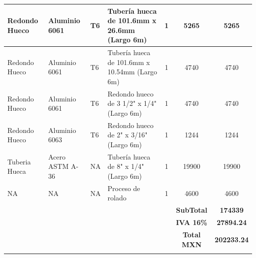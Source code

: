 \begin{landscape}
\begin{table}[H]
\begin{tabular}{|c|c|c|c|c|c|c|}
    \hline
    \multicolumn{1}{|l|}{Redondo Hueco} & \multicolumn{1}{l|}{Aluminio 6061 } & \multicolumn{1}{l|}{T6} & \multicolumn{1}{l|}{Tubería hueca de 101.6mm x 26.6mm (Largo 6m)} & 1     & \multicolumn{1}{c|}{5265} & 5265 \\
    \hline
    \multicolumn{1}{|l|}{Redondo Hueco} & \multicolumn{1}{l|}{Aluminio 6061} & \multicolumn{1}{l|}{T6} & \multicolumn{1}{l|}{Tubería hueca de 101.6mm x 10.54mm (Largo 6m)} & 1     & \multicolumn{1}{c|}{4740} & 4740 \\
    \hline
    \multicolumn{1}{|l|}{Redondo Hueco} & \multicolumn{1}{l|}{Aluminio 6061} & \multicolumn{1}{l|}{T6} & \multicolumn{1}{l|}{Redondo hueco de 3 1/2" x 1/4" (Largo 6m)} & 1     & \multicolumn{1}{c|}{4740} & 4740 \\
    \hline
    \multicolumn{1}{|l|}{Redondo Hueco} & \multicolumn{1}{l|}{Aluminio 6063} & \multicolumn{1}{l|}{T6} & \multicolumn{1}{l|}{Redondo hueco de 2" x 3/16" (Largo 6m)} & 1     & \multicolumn{1}{c|}{1244} & 1244 \\
    \hline
    \multicolumn{1}{|l|}{Tuberia Hueca} & \multicolumn{1}{l|}{Acero ASTM A-36} & \multicolumn{1}{l|}{NA} & \multicolumn{1}{l|}{Tubería hueca de 8" x 1/4" (Largo 6m)} & 1     & \multicolumn{1}{c|}{19900} & 19900 \\
    \hline
    \multicolumn{1}{|l|}{NA} & \multicolumn{1}{l|}{NA} & \multicolumn{1}{l|}{NA} & \multicolumn{1}{l|}{Proceso de rolado} & 1     & \multicolumn{1}{c|}{4600} & 4600 \\
    \hline
          &       &       &       &       & \textbf{SubTotal} & \textbf{174339} \\
    \hline
          &       &       &       &       & \textbf{IVA 16\%} & \textbf{27894.24} \\
    \hline
          &       &       &       &       & \textbf{Total MXN} & \textbf{202233.24} \\
          
    \midrule
          &       &       &       &       &       &  \\

    \hline
    \end{tabular}%
  \label{tab:CostoComercial}%
\end{table}%
\end{landscape}

